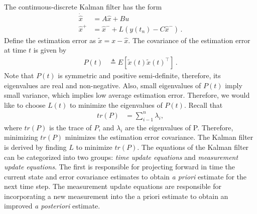 The continuous-discrete Kalman filter has the form
\begin{align}
\dot{\hat{x}}&=A\hat{x}+Bu \\
\hat{x}^+&=\hat{x}^-+L(y(t_n)-C\hat{x}^-)\,.
\end{align}
Define the estimation error as \begin{math} \tilde{x}=x-\hat{x} \end{math}. The covariance of the estimation error at time \begin{math} t \end{math} is given by
\begin{align}
P(t)&\triangleq E[\tilde{x}(t)\tilde{x}(t)^\top]\,.
\end{align}
Note that \begin{math} P(t) \end{math} is symmetric and positive semi-definite, therefore, its eigenvalues are real and non-negative. Also, small eigenvalues of \begin{math} P(t) \end{math} imply small variance, which implies low average estimation error. Therefore, we would like to choose \begin{math} L(t) \end{math} to minimize the eigenvalues of \begin{math} P(t) \end{math}. Recall that
\begin{align*}
tr(P)&=\sum_{i-1}^{n}\lambda_i, 
\end{align*}
where \begin{math} tr(P) \end{math} is the trace of \begin{math} P \end{math}, and \begin{math} \lambda_i \end{math} are the eigenvalues of P. Therefore, minimizing \begin{math} tr(P) \end{math} minimizes the estimation error covariance. The Kalman filter is derived by finding \begin{math} L \end{math} to minimize \begin{math} tr(P) \end{math}.
The equations of the Kalman filter can be categorized into two groups: \textit{time update equations} and \textit{measurement update equations}. The first is responsible for projecting forward in time the current state and error covariance estimates to obtain \textit{a priori} estimate for the next time step. The measurement update equations are responsible for incorporating a new measurement into the a priori estimate to obtain an improved \textit{a posteriori} estimate.

